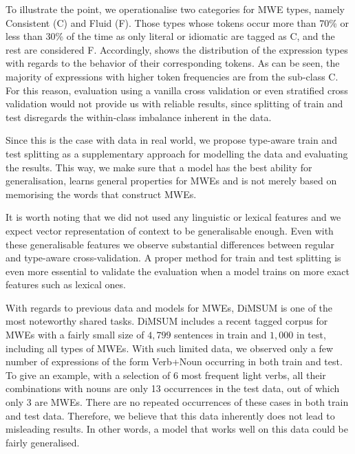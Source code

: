 \documentclass[output=paper,modfonts,nonflat]{langsci/langscibook}
\begin{document}
To illustrate the point, we operationalise two categories for MWE types, namely Consistent (C) and Fluid (F). Those types whose tokens occur more than 70\% or less than 30\% of the time as only literal or idiomatic are tagged as C, and the rest are considered F. Accordingly, %
 shows the distribution of the expression types with regards to the behavior of their corresponding tokens. As can be seen, the majority of expressions with higher token frequencies are from the sub-class C. 
For this reason, evaluation using a vanilla cross validation or even stratified cross validation would not provide us with reliable results, since splitting of train and test disregards the within-class imbalance inherent in the data. 

Since this is the case with data in real world, we propose type-aware train and test splitting as a supplementary approach for modelling the data and evaluating the results. This way, we make sure that a model has the best ability for generalisation, learns general properties for MWEs and is not merely based on memorising the words that construct MWEs.%

It is worth noting that we did not used any linguistic or lexical features and we expect vector representation of context to be generalisable enough. Even with these generalisable features we observe substantial differences between regular and type-aware cross-validation.
A proper method for train and test splitting is even more essential to validate the evaluation when a model trains on more exact features such as lexical ones.

With regards to previous data and models for MWEs, DiMSUM is one of the most noteworthy shared tasks.
DiMSUM includes a recent tagged corpus for MWEs with a fairly small size of $4,799$ sentences in train and $1,000$ in test, including all types of MWEs. With such limited data, we observed only a few number of expressions of the form Verb+Noun occurring in both train and test. To give an example, with a selection of 6 most frequent light verbs, all their combinations with nouns are only 13 occurrences in the test data, out of which only 3 are MWEs. There are no repeated occurrences of these cases in both train and test data. Therefore, we believe that this data inherently does not lead to misleading results. In other words, a model that works well on this data could be fairly generalised.
\end{document}
